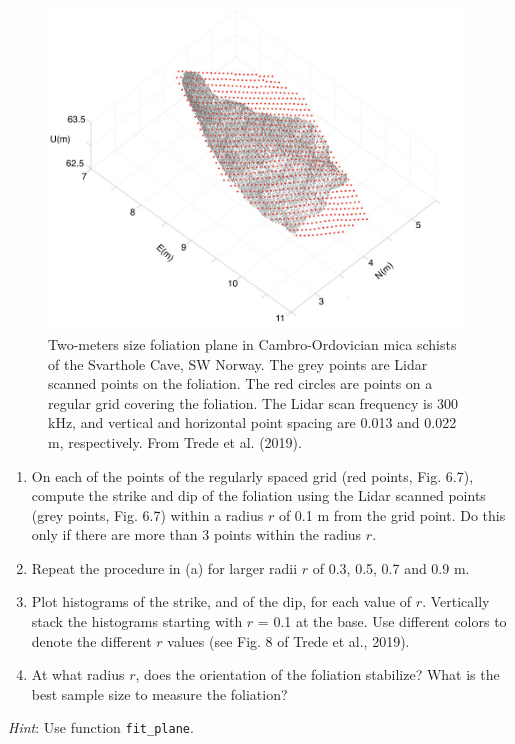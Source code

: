 \documentclass[a4paper , 12pt]{book}
\newcommand{\code}[1]{\colorbox{light-gray}{\texttt{#1}}}
\begin{document}
\begin{enumerate}
    \begin{figure}[ht]
    \centering
    \includegraphics[width=11cm]{ch6f8.pdf}
    \caption{Two-meters size foliation plane in Cambro-Ordovician mica schists of the Svarthole Cave, SW Norway. The grey points are Lidar scanned points on the foliation. The red circles are points on a regular grid covering the foliation. The Lidar scan frequency is 300 kHz, and vertical and horizontal point spacing are 0.013 and 0.022 m, respectively. From Trede et al. (2019).}
\end{figure}
    
    \begin{enumerate}
        \item On each of the points of the regularly spaced grid (red points, Fig. 6.7), compute the strike and dip of the foliation using the Lidar scanned points (grey points, Fig. 6.7) within a radius $r$ of 0.1 m from the grid point. Do this only if there are more than 3 points within the radius $r$.
        \item Repeat the procedure in (a) for larger radii $r$ of 0.3, 0.5, 0.7 and 0.9 m.
        \item Plot histograms of the strike, and of the dip, for each value of $r$. Vertically stack the histograms starting with $r$ = 0.1 at the base. Use different colors to denote the different $r$ values (see Fig. 8 of Trede et al., 2019).
        \item At what radius $r$, does the orientation of the foliation stabilize? What is the best sample size to measure the foliation?
    \end{enumerate}
    
    \textit{Hint}: Use function \code{fit\_plane}.
    
\end{enumerate}
\end{document}
